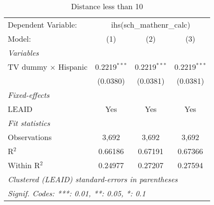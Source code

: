 \begin{table}[htbp]
\centering
\caption{Distance less than 10}
\begin{tabular}{lccc}
\tabularnewline\midrule\midrule
Dependent Variable:&\multicolumn{3}{c}{ihs(sch\_mathenr\_calc)}\\
Model:&(1) & (2) & (3)\\
\midrule \emph{Variables}&   &   &  \\
TV dummy $\times$ Hispanic & 0.2219$^{***}$ & 0.2219$^{***}$ & 0.2219$^{***}$\\
  &(0.0380) & (0.0381) & (0.0381)\\
\midrule \emph{Fixed-effects}&   &   &  \\
LEAID & Yes & Yes & Yes\\
\midrule \emph{Fit statistics}&  & & \\
Observations & 3,692&3,692&3,692\\
R$^2$ & 0.66186&0.67191&0.67366\\
Within R$^2$ & 0.24977&0.27207&0.27594\\
\midrule\midrule\multicolumn{4}{l}{\emph{Clustered (LEAID) standard-errors in parentheses}}\\
\multicolumn{4}{l}{\emph{Signif. Codes: ***: 0.01, **: 0.05, *: 0.1}}\\
\end{tabular}
\end{table}

